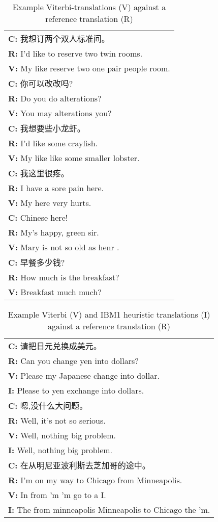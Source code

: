 \documentclass[11pt, a4paper]{article}
\begin{document}
\begin{table}
{\small
\begin{tabular}{ |l| } 
\hline
\textbf{C:} 我想订两个双人标准间。\\
\textbf{R:} I'd like to reserve two twin rooms. \\
\textbf{V:} My like reserve two one pair people room. \\
\hline
\textbf{C:} 你可以改改吗? \\
\textbf{R:} Do you do alterations? \\
\textbf{V:} You may alterations you? \\
\hline
\textbf{C:} 我想要些小龙虾。 \\
\textbf{R:} I'd like some crayfish. \\
\textbf{V:} My like like some smaller lobster. \\
\hline
\textbf{C:} 我这里很疼。 \\
\textbf{R:} I have a sore pain here. \\
\textbf{V:} My here very hurts. \\
\hline
\textbf{C:} Chinese here! \\
\textbf{R:} My's happy, green sir. \\
\textbf{V:} Mary is not so old as henr .\\
\hline
\textbf{C:} 早餐多少钱? \\
\textbf{R:} How much is the breakfast? \\
\textbf{V:} Breakfast much much? \\
\hline
\end{tabular}
}
\caption{Example Viterbi-translations (V) against a reference translation (R)}
\label{table:translations}
\end{table}

\begin{table}
\begin{tabular}{ |l| } 
\hline
\textbf{C:} 请把日元兑换成美元。 \\
\textbf{R:} Can you change yen into dollars? \\
\textbf{V:} Please my Japanese change into dollar. \\
\textbf{I:} Please to yen exchange into dollars. \\
\hline
\textbf{C:} 嗯,没什么大问题。 \\
\textbf{R:} Well, it's not so serious. \\
\textbf{V:} Well, nothing big problem. \\
\textbf{I:} Well, nothing big problem. \\
\hline
\textbf{C:} 在从明尼亚波利斯去芝加哥的途中。 \\
\textbf{R:} I'm on my way to Chicago from Minneapolis. \\
\textbf{V:} In from 'm 'm go to a I. \\
\textbf{I:} The from minneapolis Minneapolis to Chicago the 'm. \\
\hline 
\end{tabular}
\caption{Example Viterbi (V) and IBM1 heuristic translations (I) against a reference translation (R)}
\label{table:translations-2}
\end{table}
\end{document}
